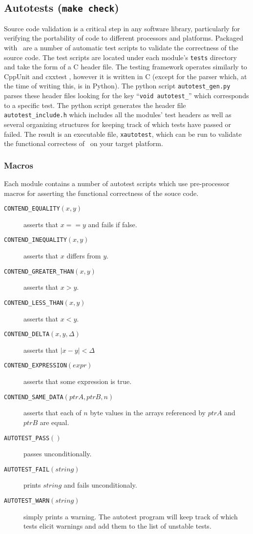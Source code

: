\subsection{Autotests ({\tt make check})}
\label{section:installation:targets:autotests}
Source code validation is a critical step in any software library,
particularly for verifying the portability of code to different processors and
platforms.
Packaged with \liquid\ are a number of automatic test scripts to validate the
correctness of the source code.
The test scripts are located under each module's {\tt tests} directory and
take the form of a C header file.
The testing framework operates similarly to CppUnit \cite{cppunit:web} and
cxxtest \cite{cxxtest:web}, however it is written in C (except for the
parser which, at the time of writing this, is in Python).
The python script {\tt autotest\_gen.py} parses these header files looking for
the key ``{\tt void autotest\_}'' which corresponds to a specific test.
The python script generates the header file {\tt autotest\_include.h} which
includes all the modules' test headers as well as several organizing
structures for keeping track of which tests have passed or failed.
The result is an executable file, {\tt xautotest}, which can be run to
validate the functional correctess of \liquid\ on your target platform.

\subsubsection{Macros}
Each module contains a number of autotest scripts which use pre-processor
macros for asserting the functional correctness of the souce code.

\begin{description}
\item[{\tt CONTEND\_EQUALITY}$(x,y)$] asserts that $x==y$ and fails if
false.
\item[{\tt CONTEND\_INEQUALITY}$(x,y)$] asserts that $x$ differs from
$y$.
\item[{\tt CONTEND\_GREATER\_THAN}$(x,y)$] asserts that $x>y$.
\item[{\tt CONTEND\_LESS\_THAN}$(x,y)$] asserts that $x<y$.
\item[{\tt CONTEND\_DELTA}$(x,y,\Delta)$] asserts that $|x-y|<\Delta$
\item[{\tt CONTEND\_EXPRESSION}$(expr)$] asserts that some expression is
true.
\item[{\tt CONTEND\_SAME\_DATA}$(ptrA,ptrB,n)$] asserts that each of $n$
byte values in the arrays referenced by $ptrA$ and $ptrB$ are equal.
\item[{\tt AUTOTEST\_PASS}$()$] passes unconditionally.
\item[{\tt AUTOTEST\_FAIL}$(string)$] prints $string$ and fails
unconditionaly.
\item[{\tt AUTOTEST\_WARN}$(string)$] simply prints a warning.
The autotest program will keep track of which tests elicit warnings and add
them to the list of unstable tests.
\end{description}

